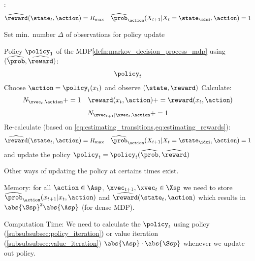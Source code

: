 \begin{algorithmbox}\nospacing
  \begin{algo}\leavevmode
    \begin{algorithmic}[1]
      \item[] :
      \begin{align}
        \widehat{\reward}(\state_{t},\action)=R_{\max}&&\widehat{\prob}_{\action}(X_{t+1}|X_{t}=\state_{\idxi},\action)=1
      \end{align}
      \item[] Set min.\ number $\Delta$ of observations for policy update
      \item[]  Policy $\policy_{1}$ of the MDP\cref{defn:markov_decision_process_mdp} using $(\widehat{\prob},\widehat{\reward})$:
      \begin{align*}
        \policy_{t}
      \end{align*}
        \State Choose $\action=\policy_{t}(x_{t})$ and observe $(\state,\reward)$
        \State Calculate:
        \begin{align}
          N_{\xvec_{t},\action}+=1&&\reward(x_{t},\action)+=\reward(x_{t},\action)
        \end{align}
        \begin{align}
          N_{\xvec_{t+1}|\xvec_{t},\action}+=1
        \end{align}
        \If{$\idxk$==$\Delta$}
            \State Re-calculate (based on \cref{eq:estimating_transitions,eq:estimating_rewards}):
            \begin{align*}
                \widehat{\reward}(\state_{t},\action)=R_{\max}&&\widehat{\prob}_{\action}(X_{t+1}|X_{t}=\state_{\idxi},\action)=1
            \end{align*}
            \Statex and update the policy $\policy_{t}=\policy_{t}(\widehat{\prob},\widehat{\reward})$
        \EndIf
      \EndFor
    \end{algorithmic}
  \end{algo}
\end{algorithmbox}
\begin{notebox}[Note]\nospacing
  Other ways of updating the policy at certains times exist.
\end{notebox}
\begin{sectionbox}[Problems]\nospacing
 \begin{conslist}
   \item Memory:
     for all $\action\in\Asp$, $\xvec_{t+1},\xvec_{t}\in\Xsp$
           we need to store $\widehat{\prob}_{\action}(x_{t+1}|x_{t},\action)$ and $\widehat{\reward}(\state_{t},\action)$ which
           results in $\abs{\Ssp}^{2}\abs{\Asp}$ (for dense MDP).
           \item Computation Time:
           We need to calculate the $\policy_{t}$ using policy (\cref{subsubsubsec:policy_iteration}) or value iteration (\cref{subsubsubsec:value_iteration})
           $\abs{\Asp}\cdot\abs{\Ssp}$ whenever we update out policy.
 \end{conslist}
\end{sectionbox}
